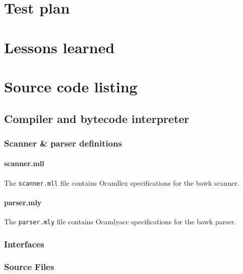 \documentclass[letterpaper,11pt]{report}
\begin{document}
\chapter{Test plan}


\chapter{Lessons learned}



\chapter{Source code listing}
\lstset{language=Caml,defaultdialect=[Objective]Caml}

\section{Compiler and bytecode interpreter}
\subsection{Scanner \& parser definitions}
\subsubsection{scanner.mll}
The \texttt{scanner.mll} file contains Ocamllex specifications for the bawk scanner.

\subsubsection{parser.mly}
The \texttt{parser.mly} file contains Ocamlyacc specifications for the bawk parser.


\subsection{Interfaces}









\subsection{Source Files}







\end{document}

